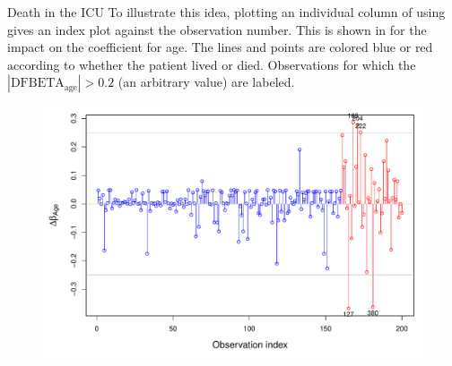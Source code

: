 \documentclass[11pt]{book}
\renewenvironment{knitrout}{\small\renewcommand{\baselinestretch}{.85}}{} %
\begin{document}
\begin{Example}[icu2]{Death in the ICU}
To illustrate this idea, plotting an individual column of  using 
gives an index plot against the observation number. This is shown in 
for the impact on the coefficient for age.
The lines and points are colored
blue or red according to whether the patient lived or died.
Observations for which the $|\mbox{DFBETA}_{\mbox{age}}| > 0.2$ (an arbitrary value)
are labeled.  
\begin{knitrout}
\color{fgcolor}\begin{kframe}
\begin{alltt}
\hlkwb{=} \hlopt{$}\hlopt{==}\hlstd{,} \hlstd{,} \hlstd{)}
 \hlkwb{<-} \hlstd{(}\hlstd{=}\hlstd{(}\hlstd{,}\hlstd{,}\hlstd{,}\hlstd{)}\hlopt{+}\hlstd{)}
\hlstd{(dfbetas[,}\hlstd{],}  \hlstd{=} \hlstd{,} 
     \hlstd{=}\hlstd{,}
     \hlstd{=} \hlopt{*} 
     \hlstd{=}\hlstd{)}
\hlstd{(dfbetas[,}\hlstd{],} 
 \hlkwb{<-} \hlstd{(dfbetas[,}\hlstd{])} \hlopt{>} 
 \hlkwb{<-} \hlopt{:}
\hlstd{(idx[big], dfbetas[big,}\hlstd{],} \hlstd{=}
     \hlstd{=}\hlstd{,} \hlstd{=}\hlstd{(dfbetas[big,}\hlstd{]}\hlopt{>}\hlstd{,} \hlstd{,} \hlstd{),}
     \hlstd{=}\hlstd{)}
\hlstd{(}\hlstd{=}\hlstd{(}\hlopt{-}\hlstd{,} \hlstd{,} \hlstd{),} \hlstd{=}\hlstd{)}
\end{alltt}
\end{kframe}\begin{figure}[!htbp]


\centerline{\includegraphics[width=.8\textwidth]{ch07/fig/icu2-dbage} }


\end{figure}
\end{knitrout}
\end{Example}
\end{document}
